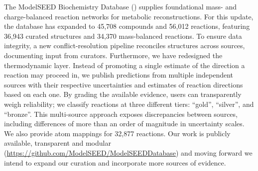 The ModelSEED Biochemistry Database (\modelseedurl) supplies foundational mass- and charge-balanced reaction networks for metabolic reconstructions. For this update, the database has expanded to 45,708 compounds and 56,012 reactions, featuring 36,943 curated structures and 34,370 mass-balanced reactions. To ensure data integrity, a new conflict-resolution pipeline reconciles structures across sources, documenting input from curators. Furthermore, we have redesigned the thermodynamic layer. Instead of promoting a single estimate of the direction a reaction may proceed in, we publish predictions from multiple independent sources with their respective uncertainties and estimates of reaction directions based on each one. By grading the available evidence, users can transparently weigh reliability; we classify reactions at three different tiers: ``gold'', ``silver'', and ``bronze''. This multi-source approach exposes discrepancies between sources, including differences of more than an order of magnitude in uncertainty scales. We also provide atom mappings for 32,877 reactions. Our work is publicly available, transparent and modular (\url{https://github.com/ModelSEED/ModelSEEDDatabase}) and moving forward we intend to expand our curation and incorporate more sources of evidence.
